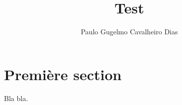 \documentclass{article}
\author{Paulo Gugelmo Cavalheiro Dias}
\title{Test}
\begin{document}
\maketitle

\section{Première section}

Bla bla. 
\end{document}
